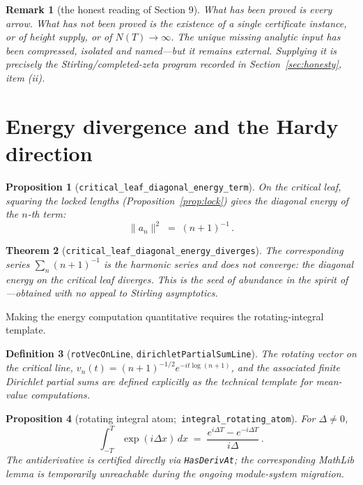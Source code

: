 \documentclass[submission]{jsfds}
\newtheorem{theorem}{Theorem}
\newtheorem{proposition}[theorem]{Proposition}
\newtheorem{definition}[theorem]{Definition}
\newtheorem*{remark}{Remark}
\newcommand{\Lean}[1]{\texttt{#1}}
\newcommand{\Norm}[1]{\lVert #1\rVert}
\begin{document}
\begin{remark}[the honest reading of Section 9]\label{remark:family}
What has been proved is every arrow. What has \emph{not} been proved is the
existence of a single certificate instance, or of height supply, or of
$N(T)\to\infty$. The unique missing analytic input has been compressed,
isolated and named---but it remains external. Supplying it is precisely the
Stirling/completed-zeta program recorded in Section~\ref{sec:honesty},
item (ii).
\end{remark}

\section{Energy divergence and the Hardy direction}\label{sec:energy}

\begin{proposition}[\Lean{critical_leaf_diagonal_energy_term}]\label{prop:diagterm}
On the critical leaf, squaring the locked lengths
(Proposition~\ref{prop:lock}) gives the diagonal energy of the $n$-th term:
\[
  \Norm{a_n}^{2} \;=\; (n+1)^{-1}\, .
\]
\end{proposition}

\begin{theorem}[\Lean{critical_leaf_diagonal_energy_diverges}]
\label{thm:diverge}
The corresponding series $\sum_n (n+1)^{-1}$ is the harmonic series and does
not converge: the diagonal energy on the critical leaf diverges. This is the
seed of abundance in the spirit of \citet{Hardy1914}---obtained with no appeal
to Stirling asymptotics.
\end{theorem}

Making the energy computation quantitative requires the rotating-integral
template.

\begin{definition}[\Lean{rotVecOnLine}, \Lean{dirichletPartialSumLine}]
\label{def:template}
The rotating vector on the critical line, $v_n(t)=(n+1)^{-1/2}
e^{-it\log(n+1)}$, and the associated finite Dirichlet partial sums are defined
explicitly as the technical template for mean-value computations.
\end{definition}

\begin{proposition}[rotating integral atom;\,
\Lean{integral_rotating_atom}]\label{prop:intatom}
For $\Delta\neq 0$,
\[
  \int_{-T}^{T} \exp(i\Delta x)\,dx
  \;=\; \frac{e^{i\Delta T}-e^{-i\Delta T}}{i\Delta}\, .
\]
The antiderivative is certified directly via \Lean{HasDerivAt}; the
corresponding MathLib lemma is temporarily unreachable during the ongoing
module-system migration.
\end{proposition}
\end{document}
